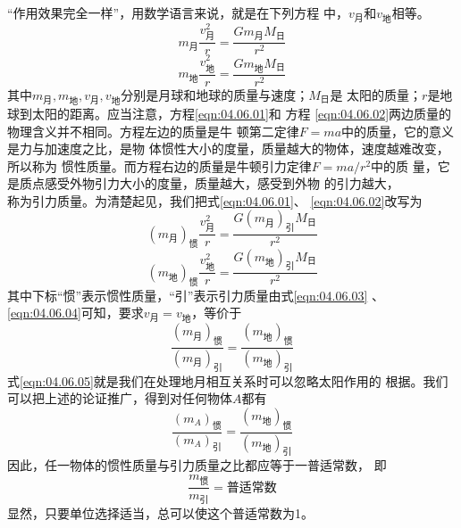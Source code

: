 “作用效果完全一样”，用数学语言来说，就是在下列方程
中，$ v_\text{月} $和$v_\text{地}$相等。
\begin{equation}\label{eqn:04.06.01}
  m _ { \text{月} } \frac { v _ { \text{月} } ^ { 2 } } { r } = \frac { G m _ { \text{月} } M _ { \text{日} } } { r ^ { 2 } }
\end{equation}
\begin{equation}\label{eqn:04.06.02}
  m _ { \text{地} } \frac { v _ { \text{地} } ^ { 2 } } { r } = \frac { G m _ { \text{地} } M _ { \text{日} } } { r ^ { 2 } }
\end{equation}
{\ziju{-0.0075pt}其中$ m _ { \text{月} } , m _ { \text{地} } , v _ { \text{月} } , v _ { \text{地} } $分别是月球和地球的质量与速度；\!$ M _ { \text{日} } $是
太阳的质量；$ r $是地球到太阳的距离。\!应当注意，\!方程\eqref{eqn:04.06.01}和
方程 \eqref{eqn:04.06.02}两边质量的物理含义并不相同。\!方程左边的质量是牛
顿第二定律$  F = m a   $中的质量，\!它的意义是力与加速度之比，\!是物
体惯性大小的度量，\!质量越大的物体，\!速度越难改变，\!所以称为
惯性质量。\!而方程右边的质量是牛顿引力定律$  F = m a / r ^ { 2 }   $中的质
量，\!它是质点感受外物引力大小的度量，\!质量越大，\!感受到外物
的引力越大，\\\!称为引力质量。\!为清楚起见，\!我们把式\eqref{eqn:04.06.01}、\!
\eqref{eqn:04.06.02}改写为}
\begin{equation}\label{eqn:04.06.03}
  \left(m _ { \text{月} }\right) _ {\text{惯}}
  \frac { v _ { \text{月} } ^ 2 } { r } = \frac { G \left(m _ { \text{月} }\right) _ {\text{引}} M _ { \text{日} } } { r ^ { 2 } }
\end{equation}
\begin{equation}\label{eqn:04.06.04}
  \left(m _ { \text{地} }\right) _ {\text{惯}}
  \frac { v _ { \text{地} } ^ 2 } { r } = \frac { G \left(m _ { \text{地} }\right) _ {\text{引}} M _ { \text{日} } } { r ^ { 2 } }
\end{equation}
其中下标“惯”表示惯性质量，“引”表示引力质量由式\eqref{eqn:04.06.03}
、\eqref{eqn:04.06.04}可知，要求$ v _ { \text{月}}=v _ { \text{地} } $，等价于
\begin{equation}\label{eqn:04.06.05}
  \frac { \left(m _ { \text{月} }\right) _ {\text{惯}} } { \left(m _ { \text{月} }\right) _ {\text{引}} } = \frac { \left(m _ { \text{地} }\right) _ {\text{惯}} } { \left(m _ { \text{地} }\right) _ {\text{引}} }
\end{equation}
式\eqref{eqn:04.06.05}就是我们在处理地月相互关系时可以忽略太阳作用的
根据。我们可以把上述的论证推广，得到对任何物体$ A $都有
\begin{equation}\label{eqn:04.06.06}
  \frac { \left(m _ { A }\right) _ {\text{惯}} } { \left(m _ { A }\right) _ {\text{引}} } = \frac { \left(m _ { \text{地} }\right) _ {\text{惯}} } { \left(m _ { \text{地} }\right) _ {\text{引}} }
\end{equation}
因此，任一物体的惯性质量与引力质量之比都应等于一普适常数，
即\vspace{-1.2em}
\begin{equation}\label{eqn:04.06.07}
  \frac { m _ {\text{惯}} } { m _ {\text{引}} } = \text{普适常数}
\end{equation}
显然，只要单位选择适当，总可以使这个普适常数为1。

